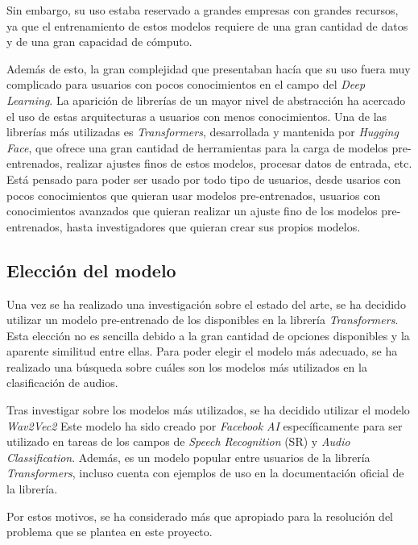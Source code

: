 Sin embargo, su uso estaba reservado a grandes empresas con grandes recursos, ya que el entrenamiento de estos modelos requiere de una gran cantidad de datos y de una gran capacidad de cómputo.

Además de esto, la gran complejidad que presentaban hacía que su uso fuera muy complicado para usuarios con pocos conocimientos en el campo del \textit{Deep Learning}.
La aparición de librerías de un mayor nivel de abstracción ha acercado el uso de estas arquitecturas a usuarios con menos conocimientos.
Una de las librerías más utilizadas es \textit{Transformers}, desarrollada y mantenida por \textit{Hugging Face}, que ofrece una gran cantidad de herramientas para la carga de modelos pre-entrenados, realizar ajustes finos de estos modelos, procesar datos de entrada, etc.
Está pensado para poder ser usado por todo tipo de usuarios, desde usarios con pocos conocimientos que quieran usar modelos pre-entrenados, usuarios con conocimientos avanzados que quieran realizar un ajuste fino de los modelos pre-entrenados, hasta investigadores que quieran crear sus propios modelos. \cite{transformers-docs}


\subsection{Elección del modelo}\label{seccion:eleccion-del-modelo}
Una vez se ha realizado una investigación sobre el estado del arte, se ha decidido utilizar un modelo pre-entrenado de los disponibles en la librería \textit{Transformers}.
Esta elección no es sencilla debido a la gran cantidad de opciones disponibles y la aparente similitud entre ellas.
Para poder elegir el modelo más adecuado, se ha realizado una búsqueda sobre cuáles son los modelos más utilizados en la clasificación de audios.

Tras investigar sobre los modelos más utilizados, se ha decidido utilizar el modelo \textit{Wav2Vec2} \cite{baevski2020wav2vec}
Este modelo ha sido creado por \textit{Facebook AI} específicamente para ser utilizado en tareas de los campos de \textit{Speech Recognition} (SR) y \textit{Audio Classification}.
Además, es un modelo popular entre usuarios de la librería \textit{Transformers}, incluso cuenta con ejemplos de uso en la documentación oficial de la librería.

Por estos motivos, se ha considerado más que apropiado para la resolución del problema que se plantea en este proyecto.

